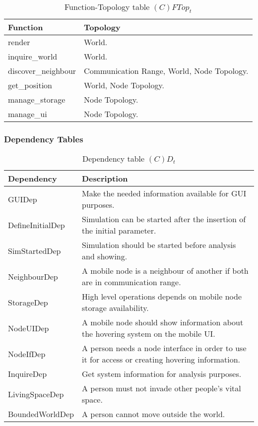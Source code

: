 \begin{table}[H]
	\centering
	\begin{tabular}{|p{4cm}|p{8cm}|}
			\hline
			\textbf{Function} & \textbf{Topology} \\
			\hline
			render & World.\\
			\hline
			inquire\_world & World.\\
			\hline
			discover\_neighbour & Communication Range, World, Node Topology. \\
			\hline
			get\_position & World, Node Topology. \\
			\hline
			manage\_storage & Node Topology. \\
			\hline
			manage\_ui & Node Topology. \\
			\hline
		\end{tabular}
	\caption{Function-Topology table $(C)FTop_t$}
	\label{tab:cftopt}
\end{table}


\subsubsection{Dependency Tables}

\begin{table}[H]
	\centering
	\begin{tabular}{|p{4cm}|p{8cm}|}
			\hline
			\textbf{Dependency} & \textbf{Description} \\
			\hline
			GUIDep & Make the needed information available for GUI purposes. \\
			\hline
			DefineInitialDep & Simulation can be started after the insertion of the
			initial parameter. \\
			\hline
			SimStartedDep & Simulation should be started before analysis and showing. \\
			\hline
			NeighbourDep & A mobile node is a neighbour of another if both are in
			communication range. \\
			\hline
			StorageDep & High level operations depends on mobile node storage availability. \\
			\hline
			NodeUIDep & A mobile node should show information about the hovering
			system on the mobile UI. \\
			\hline
			NodeIfDep & A person needs a node interface in order to use it for access
			or creating hovering information. \\
			\hline
			InquireDep & Get system information for analysis purposes. \\
			\hline
			LivingSpaceDep & A person must not invade other people's vital space. \\
			\hline
			BoundedWorldDep & A person cannot move outside the world. \\
			\hline
		\end{tabular}
	\caption{Dependency table $(C)D_t$}
	\label{tab:cdt}
\end{table}

